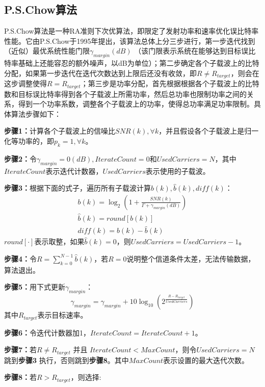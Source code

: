\subsection{P.S.Chow算法}
P.S.Chow算法\cite{chow1995practical}是一种RA准则下次优算法，即限定了发射功率和速率优化误比特率性能。它由P.S.Chow于1995年提出，该算法总体上分三步进行，第一步迭代找到（近似）最优系统性能门限$\gamma_{margin}(dB)$ （该门限表示系统在能够达到目标误比特率基础上还能容忍的额外噪声，以dB为单位）；第二步确定各个子载波上的比特分配，如果第一步迭代在迭代次数达到上限后还没有收敛，即$R\neq R_{target}$，则会在这步调整使得$R=R_{target}$；第三步是功率分配，首先根据根据各个子载波上的比特数和目标误比特率得到各个子载波上所需功率，然后总功率也限制功率之间的关系，得到一个功率系数，调整各个子载波上的功率，使得总功率满足功率限制。具体算法步骤如下：
\begin{description}
\item{\bf{步骤1：}}计算各个子载波上的信噪比$SNR(k),\forall k$，并且假设各个子载波上是归一化等功率的，即$p_k=1, \forall k$。
\item{\bf{步骤2：}}令$\gamma_{margin}=0 (dB), IterateCount =0$和$UsedCarriers=N$，其中$IterateCount$表示迭代计数器，$UsedCarriers$表示使用的子载波。
\item{\bf{步骤3：}}根据下面的式子，遍历所有子载波计算$b(k),\hat{b}(k),diff(k)$：
\begin{eqnarray}
b(k)=\log_2(1+\frac{SNR(k)}{\Gamma+\gamma_{margin}(dB)})\\
\hat{b}(k)=round[b(k)]\\
diff(k)=b(k)-\hat{b}(k)
\end{eqnarray}
$round[\cdot]$表示取整，如果$\hat{b}(k)=0$，则$UsedCarriers=UsedCarriers-1$。
\item{\bf{步骤4：}}令$R=\sum_{k=0}^{N-1}\hat{b}(k)$，若$R=0$说明整个信道条件太差，无法传输数据，算法退出。
\item{\bf{步骤5：}}用下式更新$\gamma_{margin}$：
\begin{equation}
\gamma_{margin}=\gamma_{margin}+10\log_{10}(2^{\frac{R-R_{target}}{UsedCarriers}})
\end{equation}
其中$R_{target}$表示目标速率。
\item{\bf{步骤6：}}令迭代计数器加1，$IterateCount=IterateCount+1$。
\item{\bf{步骤7：}}若$R\neq R_{target}$ 并且 $IterateCount<MaxCount$，则令$UsedCarriers=N$跳到\textbf{步骤3} 执行，否则跳到\textbf{步骤8}。其中$MaxCount$表示设置的最大迭代次数。
\item{\bf{步骤8：}}若$R>R_{target}$，则选择:

\end{description}
